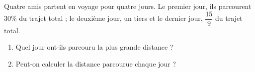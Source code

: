 
\begin{exercice}\label{exo2smath-0094}

    Quatre amis partent en voyage pour quatre jours. Le premier jour, ils parcourent $30$\% du trajet total ; le deuxième jour, un tiers et le dernier jour, \( \dfrac{ 15 }{ 9 }\) du trajet total. 

    \begin{enumerate}
        \item
 Quel jour ont-ils parcouru la plus grande distance ?
\item
Peut-on calculer la distance parcourue chaque jour ?
    \end{enumerate}


\end{exercice}
